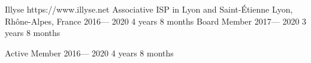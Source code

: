 \volunteerorganization%
{Illyse}%
{https://www.illyse.net}%
{Associative ISP in Lyon and Saint-Étienne}%
{Lyon, Rhône-Alpes, France}%
{2016--- 2020}%
{4 years 8 months}%
\volunteerposition%
{Board Member}%
{2017--- 2020}%
{3 years 8 months}%
{
}
\volunteerposition%
{Active Member}%
{2016--- 2020}%
{4 years 8 months}%
{}%
